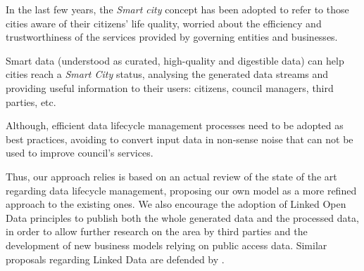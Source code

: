 In the last few years, the \textit{Smart city} concept has been adopted to refer to those cities aware of their citizens' life quality, worried about the efficiency and trustworthiness of the services provided by governing entities and businesses.

Smart data (understood as curated, high-quality and digestible data) can help cities reach a \textit{Smart City} status, analysing the generated data streams and providing useful information to their users: citizens, council managers, third parties, etc.

Although, efficient data lifecycle management processes need to be adopted as best practices, avoiding to convert input data in non-sense noise that can not be used to improve council's services.

Thus, our approach relies is based on an actual review of the state of the art regarding data lifecycle management, proposing our own model as a more refined approach to the existing ones. We also encourage the adoption of Linked Open Data principles to publish both the whole generated data and the processed data, in order to allow further research on the area by third parties and the development of new business models relying on public access data. Similar proposals regarding Linked Data are defended by \cite{Bizer:2012:MUB:2094114.2094129}.

